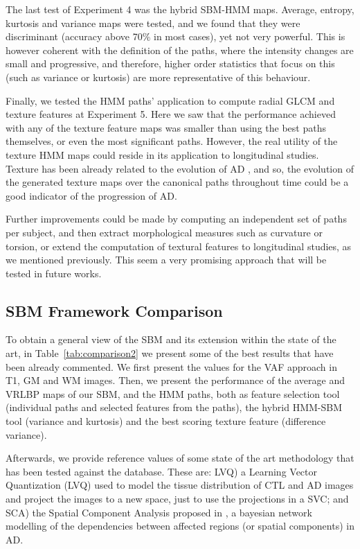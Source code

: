 The last test of Experiment 4 was the hybrid \ac{SBM}-\ac{HMM} maps. Average, entropy, kurtosis and variance maps were tested, and we found that they were discriminant (accuracy above 70\% in most cases), yet not very powerful. This is however coherent with the definition of the paths, where the intensity changes are small and progressive, and therefore, higher order statistics that focus on this (such as variance or kurtosis) are more representative of this behaviour. 

Finally, we tested the \ac{HMM} paths' application to compute radial \ac{GLCM} and texture features at Experiment 5. Here we saw that the performance achieved with any of the texture feature maps was smaller than using the best paths themselves, or even the most significant paths. However, the real utility of the texture \ac{HMM} maps could reside in its application to longitudinal studies. Texture has been already related to the evolution of \ac{AD} \cite{sikio2015mr}, and so, the evolution of the generated texture maps over the canonical paths throughout time could be a good indicator of the progression of \ac{AD}. 

Further improvements could be made by computing an independent set of paths per subject, and then extract morphological measures such as curvature or torsion, or extend the computation of textural features to longitudinal studies, as we mentioned previously. This seem a very promising approach that will be tested in future works. 

\subsection{\acs{SBM} Framework Comparison}
To obtain a general view of the \ac{SBM} and its extension within the state of the art, in Table~\ref{tab:comparison2} we present some of the best results that have been already commented. We first present the values for the \ac{VAF} approach \cite{Stoeckel04} in T1, \ac{GM} and \ac{WM} images. Then, we present the performance of the average and \ac{VRLBP} maps of our \ac{SBM}, and the \ac{HMM} paths, both as feature selection tool (individual paths and selected features from the paths), the hybrid \ac{HMM}-\ac{SBM} tool (variance and kurtosis) and the best scoring texture feature (difference variance). 

Afterwards, we provide reference values of some state of the art methodology that has been tested against the \adnimri{} database. These are: LVQ) a Learning Vector Quantization (LVQ) \cite{Ortiz2013} used to model the tissue distribution of \ac{CTL} and \ac{AD} images and project the images to a new space, just to use the projections in a \ac{SVC}; and SCA) the Spatial Component Analysis proposed in \cite{Illan2014}, a bayesian network modelling of the dependencies between affected regions (or spatial components) in \ac{AD}. 

